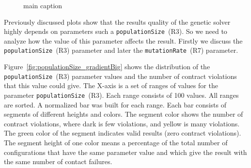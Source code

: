 \begin{figure}
	
	
	\caption{main caption}
	\label{fig:populationSize_gradient}
\end{figure}

Previously discussed plots show that the results quality of the genetic solver highly depends on parameters such a \texttt{populationSize}~(R3). So we need to analyze how the value of this parameter affects the result. Firstly we discuss the \texttt{populationSize}~(R3) parameter and later the \texttt{mutationRate}~(R7) parameter.

Figure~\ref{fig:populationSize_gradientBig} shows the distribution of the \texttt{populationSize}~(R3) parameter values and the number of contract violations that this value could give. The X-axis is a set of ranges of values for the parameter \texttt{populationSize}~(R3). Each range consists of 100 values. All ranges are sorted. A normalized bar was built for each range. Each bar consists of segments of different heights and colors. The segment color shows the number of contract violations, where dark is few violations, and yellow is many violations. The green color of the segment indicates valid results (zero contract violations). The segment height of one color means a percentage of the total number of configurations that have the same parameter value and which give the result with the same number of contact failures.

